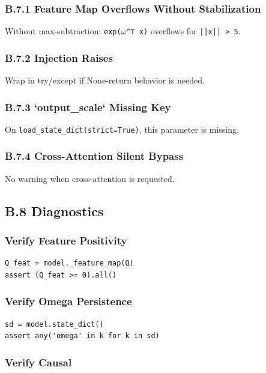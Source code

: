 \subsubsection{B.7.1 Feature Map Overflows Without Stabilization}

Without max-subtraction: \texttt{exp($\omega$\^{}T x)} overflows for \texttt{||x|| > 5}.

\subsubsection{B.7.2 Injection Raises}

Wrap in try/except if None-return behavior is needed.

\subsubsection{B.7.3 `output\_scale` Missing Key}

On \texttt{load\_state\_dict(strict=True)}, this parameter is missing.

\subsubsection{B.7.4 Cross-Attention Silent Bypass}

No warning when cross-attention is requested.

\subsection{B.8 Diagnostics}

\subsubsection{Verify Feature Positivity}

\begin{lstlisting}
Q_feat = model._feature_map(Q)
assert (Q_feat >= 0).all()
\end{lstlisting}

\subsubsection{Verify Omega Persistence}

\begin{lstlisting}
sd = model.state_dict()
assert any('omega' in k for k in sd)
\end{lstlisting}

\subsubsection{Verify Causal}

